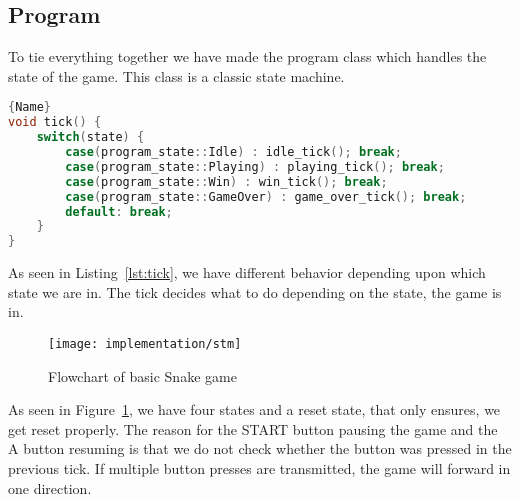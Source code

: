 \subsection{Program}
To tie everything together we have made the program class which handles the state of the game. This class is a classic state machine.

\begin{lstlisting}[caption={A tick of the game},label={lst:tick},frame=tlrb, language=C++]{Name}
void tick() {
	switch(state) {
		case(program_state::Idle) : idle_tick(); break;
		case(program_state::Playing) : playing_tick(); break;
		case(program_state::Win) : win_tick(); break;
		case(program_state::GameOver) : game_over_tick(); break;
		default: break;
	}
}
\end{lstlisting}

As seen in Listing~\ref{lst:tick}, we have different behavior depending upon which state we are in. The tick decides what to do depending on the state, the game is in.

\begin{figure}
\centering
\texttt{[image: implementation/stm]}
\caption{Flowchart of basic Snake game}
\label{fig:flow_program}
\end{figure}

As seen in Figure~\ref{fig:flow_program}, we have four states and a reset state, that only ensures, we get reset properly. The reason for the START button pausing the game and the A button resuming is that we do not check whether the button was pressed in the previous tick.  If multiple button presses are transmitted, the game will forward in one direction.
